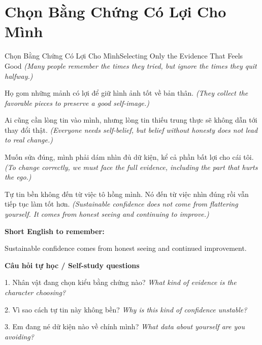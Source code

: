 \section{Chọn Bằng Chứng Có Lợi Cho Mình}
\begin{truyen}{Chọn Bằng Chứng Có Lợi Cho Mình}{Selecting Only the Evidence That Feels Good}
\textit{(Many people remember the times they tried, but ignore the times they quit halfway.)}

Họ gom những mảnh có lợi để giữ hình ảnh tốt về bản thân.
\textit{(They collect the favorable pieces to preserve a good self-image.)}

Ai cũng cần lòng tin vào mình, nhưng lòng tin thiếu trung thực sẽ không dẫn tới thay đổi thật.
\textit{(Everyone needs self-belief, but belief without honesty does not lead to real change.)}

Muốn sửa đúng, mình phải dám nhìn đủ dữ kiện, kể cả phần bất lợi cho cái tôi.
\textit{(To change correctly, we must face the full evidence, including the part that hurts the ego.)}

\end{truyen}

\begin{baihoc}
Tự tin bền không đến từ việc tô hồng mình. Nó đến từ việc nhìn đúng rồi vẫn tiếp tục làm tốt hơn.
\textit{(Sustainable confidence does not come from flattering yourself. It comes from honest seeing and continuing to improve.)}
\end{baihoc}

\begin{ghinhoanh}
\textbf{Short English to remember:}

Sustainable confidence comes from honest seeing and continued improvement.

\end{ghinhoanh}

\begin{tuhocnhanh}
\textbf{Câu hỏi tự học / Self-study questions}

1. Nhân vật đang chọn kiểu bằng chứng nào? \textit{What kind of evidence is the character choosing?}

2. Vì sao cách tự tin này không bền? \textit{Why is this kind of confidence unstable?}

3. Em đang né dữ kiện nào về chính mình? \textit{What data about yourself are you avoiding?}
\end{tuhocnhanh}
\ngancach

